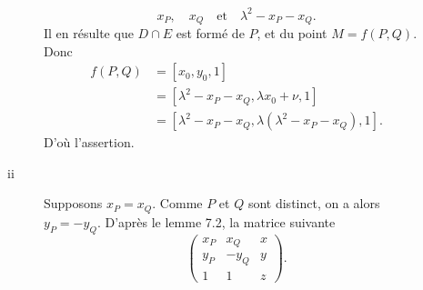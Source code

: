 \begin{demonstration}
\begin{description}
\begin{description}
           \[
           x_P, \quad x_Q \quad \text{et} \quad \lambda^2 - x_P - x_Q
           .\] 
           Il en résulte que $D \cap E$ est formé de $P$, et du point $M = f(P,Q)$.
           Donc  
           \begin{align*}
               f(P,Q) &= \left[ x_0, y_0, 1 \right] \\
                      &= \left[ \lambda^2 - x_P - x_Q, \lambda x_0 + \nu, 1 \right] \\
                      &= \left[ \lambda^2 - x_P - x_Q, \lambda\left( \lambda^2 - x_P - x_Q \right), 1\right]
           .\end{align*}
           D'où l'assertion.
           \item[ii] Supposons $x_P = x_Q$. Comme $P$ et $Q$ sont distinct, on a alors $y_P = - y_Q$.
               D'après le lemme 7.2, la matrice suivante
               \[
                   \begin{pmatrix} x_P & x_Q & x \\
                   y_P & - y_Q & y \\
               1 & 1 & z
           \end{pmatrix} 
               .\] 


\end{description}
\end{description}
\end{demonstration}
